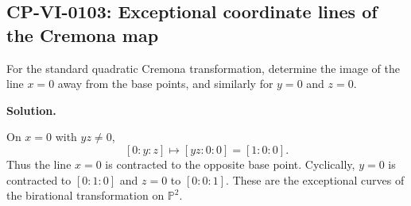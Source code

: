
\subsection*{CP-VI-0103: Exceptional coordinate lines of the Cremona map}

For the standard quadratic Cremona transformation, determine the image of the line $x=0$ away from the base points, and similarly for $y=0$ and $z=0$.

\medskip
\noindent\textbf{Solution.}

On $x=0$ with $yz\ne0$,
\[
[0:y:z]\mapsto[yz:0:0]=[1:0:0].
\]
Thus the line $x=0$ is contracted to the opposite base point. Cyclically, $y=0$ is contracted to $[0:1:0]$ and $z=0$ to $[0:0:1]$. These are the exceptional curves of the birational transformation on $\mathbb P^2$.
